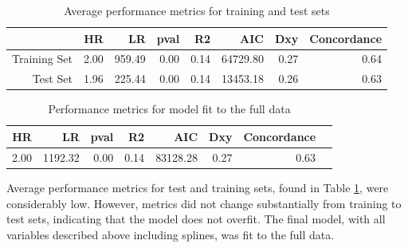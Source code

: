 \documentclass{article}
\begin{document}
\begin{table}[ht]
\centering
\caption{Average performance metrics for training and test sets} 
\begin{tabular}{rrrrrrrr}
  \hline
 & HR & LR & pval & R2 & AIC & Dxy & Concordance \\ 
  \hline
  Training Set & 2.00 & 959.49 & 0.00 & 0.14 & 64729.80 & 0.27 & 0.64 \\ 
  Test Set & 1.96 & 225.44 & 0.00 & 0.14 & 13453.18 & 0.26 & 0.63 \\ 
   \hline
\end{tabular}
\label{table:cv}
\end{table}

\begin{table}[ht]
\centering
\caption{Performance metrics for model fit to the full data} 
\begin{tabular}{rrrrrrrr}
  \hline
  HR & LR & pval & R2 & AIC & Dxy & Concordance \\ 
  \hline
  2.00 & 1192.32 & 0.00 & 0.14 & 83128.28 & 0.27 & 0.63 \\ 
   \hline
\end{tabular}
\label{table:finalmetrics}
\end{table}

Average performance metrics for test and training sets, found in Table \ref{table:cv}, were considerably low. However, metrics did not change substantially from training to test sets, indicating that the model does not overfit. The final model, with all variables described above including splines, was fit to the full data.
\end{document}

